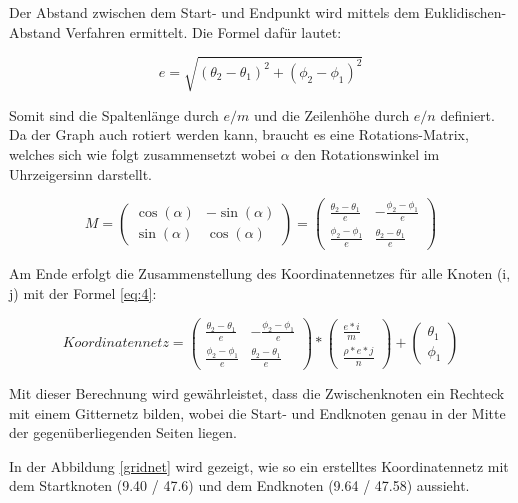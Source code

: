 Der Abstand zwischen dem Start- und Endpunkt wird mittels dem
Euklidischen-Abstand Verfahren ermittelt. Die Formel dafür lautet:

\begin{equation}
\label{eq:2}
e = \sqrt{ (\theta_2 - \theta_1)^2 + (\phi_2-\phi_1)^2}
\end{equation}

Somit sind die Spaltenlänge durch $e/m$ und die Zeilenhöhe durch $e/n$ definiert.
Da der Graph auch rotiert werden kann, braucht es eine Rotations-Matrix,
welches sich wie folgt zusammensetzt wobei $\alpha$ den Rotationswinkel im
Uhrzeigersinn darstellt.

\begin{equation}
\label{eq:3}
 M = \begin{pmatrix} \cos(\alpha) & -\sin(\alpha) \\ \sin(\alpha) &
 \cos(\alpha) \end{pmatrix} = \begin{pmatrix} \frac{\theta_2 - \theta_1}{e} &
 -\frac{\phi_2 - \phi_1}{e} \\ \frac{\phi_2 - \phi_1}{e} & \frac{\theta_2 -
 \theta_1}{e} \end{pmatrix}
\end{equation}

Am Ende erfolgt die Zusammenstellung des Koordinatennetzes für alle Knoten (i,
j) mit der Formel \eqref{eq:4}:

\begin{equation}
\label{eq:4}
Koordinatennetz = \begin{pmatrix} \frac{\theta_2 - \theta_1}{e} & -\frac{\phi_2 - \phi_1}{e} \\ \frac{\phi_2 - \phi_1}{e} & \frac{\theta_2 - \theta_1}{e} \end{pmatrix} * \begin{pmatrix}  \frac{e*i}{m} \\ \frac{\rho*e*j}{n} \end{pmatrix} + \begin{pmatrix}  \theta_1 \\ \phi_1 \end{pmatrix}
\end{equation}

Mit dieser Berechnung wird gewährleistet, dass die Zwischenknoten ein Rechteck
mit einem Gitternetz bilden, wobei die Start- und Endknoten genau in der Mitte
der gegenüberliegenden Seiten liegen.

In der Abbildung \ref{gridnet} wird gezeigt, wie so ein erstelltes
Koordinatennetz mit dem Startknoten (9.40 / 47.6) und dem Endknoten (9.64 /
47.58) aussieht.

